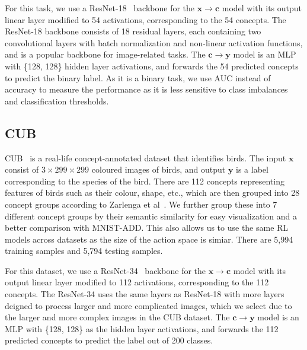 For this task, we use a ResNet-18~\cite{resnet} backbone for the $\mathbf{x} \to \mathbf{c}$
model with its output linear layer modified to 54 activations, corresponding
to the 54 concepts. The ResNet-18 backbone consists of 18 residual layers,
each containing two convolutional layers with batch normalization and non-linear
activation functions, and is a popular backbone for image-related tasks.
The $\mathbf{c} \to \mathbf{y}$ model is an MLP with \{128, 128\} hidden
layer activations, and forwards the 54 predicted concepts to predict the binary label.
As it is a binary task, we use AUC instead of accuracy to measure the performance 
as it is less sensitive to class imbalances 
and classification thresholds.

\subsection{CUB}

CUB~\cite{cub} is a real-life concept-annotated dataset that identifies birds.
The input $\mathbf{x}$ consist of $3 \times 299 \times 299$ coloured images of 
 birds, and output $\mathbf{y}$ is a label corresponding to the species of the bird.
There are 
112 concepts 
representing features of birds such as their colour, shape, etc.,
which are then grouped into 28 concept groups according
to Zarlenga et al~\cite{intcem}. We further group these
into 7 different concept groups by their
semantic similarity for easy visualization and a better comparison
with MNIST-ADD. This also allows us to use the same RL models across datasets
as the size of the action space is simiar. There are 
5,994 training samples and 5,794 testing samples.

For this dataset, we use a ResNet-34~\cite{resnet} backbone for the 
$\mathbf{x} \to \mathbf{c}$
model with its output linear layer modified to 112 activations, corresponding
to the 112 concepts. The ResNet-34 uses the same layers as ResNet-18
with more layers deigned to process larger and more complicated images,
which we select due to the larger and more complex images in the CUB dataset.
The $\mathbf{c} \to \mathbf{y}$ model is an MLP with \{128, 128\} as the hidden
layer activations, and forwards the 112 predicted concepts to predict the label out of 200 classes.


